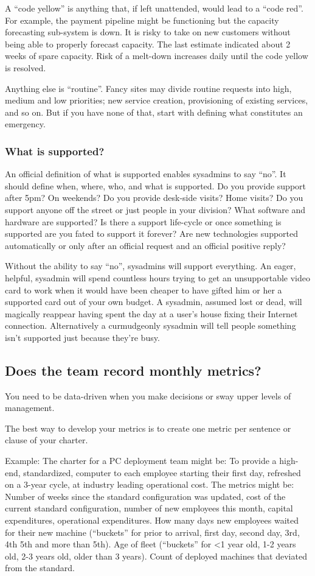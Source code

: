 \documentclass{article}
\begin{document}
A ``code yellow'' is anything that, if left unattended, would lead to a ``code red''. For example, the payment pipeline might be functioning but the capacity forecasting sub-system is down. It is risky to take on new customers without being able to properly forecast capacity. The last estimate indicated about 2 weeks of spare capacity. Risk of a melt-down increases daily until the code yellow is resolved.

Anything else is ``routine''. Fancy sites may divide routine requests into high, medium and low priorities; new service creation, provisioning of existing services, and so on. But if you have none of that, start with defining what constitutes an emergency.

\subsubsection*{What is supported?}
An official definition of what is supported enables sysadmins to say ``no''. It should define when, where, who, and what is supported. Do you provide support after 5pm? On weekends? Do you provide desk-side visits? Home visits? Do you support anyone off the street or just people in your division? What software and hardware are supported? Is there a support life-cycle or once something is supported are you fated to support it forever? Are new technologies supported automatically or only after an official request and an official positive reply?

Without the ability to say ``no'', sysadmins will support everything. An eager, helpful, sysadmin will spend countless hours trying to get an unsupportable video card to work when it would have been cheaper to have gifted him or her a supported card out of your own budget. A sysadmin, assumed lost or dead, will magically reappear having spent the day at a user's house fixing their Internet connection. Alternatively a curmudgeonly sysadmin will tell people something isn't supported just because they're busy.

\subsection{Does the team record monthly metrics? \Checkmark}
You need to be data-driven when you make decisions or sway upper levels of management.

The best way to develop your metrics is to create one metric per sentence or clause of your charter.

Example: The charter for a PC deployment team might be: To provide a high-end, standardized, computer to each employee starting their first day, refreshed on a 3-year cycle, at industry leading operational cost. The metrics might be: Number of weeks since the standard configuration was updated, cost of the current standard configuration, number of new employees this month, capital expenditures, operational expenditures. How many days new employees waited for their new machine (``buckets'' for prior to arrival, first day, second day, 3rd, 4th 5th and more than 5th). Age of fleet (``buckets'' for <1 year old, 1-2 years old, 2-3 years old, older than 3 years). Count of deployed machines that deviated from the standard.
\end{document}
